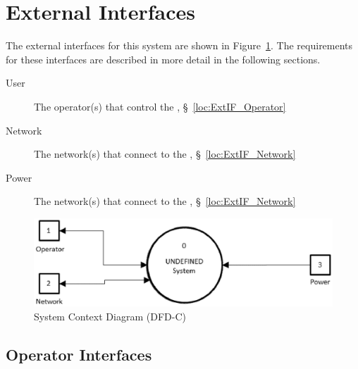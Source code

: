 \newpage
\section{External Interfaces}
\label{loc:ExternalInterfaces}


The external interfaces for this system are shown in Figure~\ref{fig:DFD-C}.
The requirements for these interfaces are described in more detail in the following sections.
\begin{description}
	\item[User] The operator(s) that control the \ThisSys, \S~\ref{loc:ExtIF_Operator}
	\item[Network] The network(s) that connect to the \ThisSys, \S~\ref{loc:ExtIF_Network}
	\item[Power] The network(s) that connect to the \ThisSys, \S~\ref{loc:ExtIF_Network}
\end{description}
\begin{figure}[htbp]
	\centering
		\includegraphics[width=6.5in]{../zProjectWideData/images/DFD-C_300dpi_6.5inchesWide.eps}
	\caption[System Context Diagram]{System Context Diagram (DFD-C)}
	\label{fig:DFD-C}
\end{figure}

\KNEADSUBSECTIONNEWPAGE
\subsection{Operator Interfaces}
\label{loc:ExtIF_Operator}




\KNEADSUBSECTIONNEWPAGE

